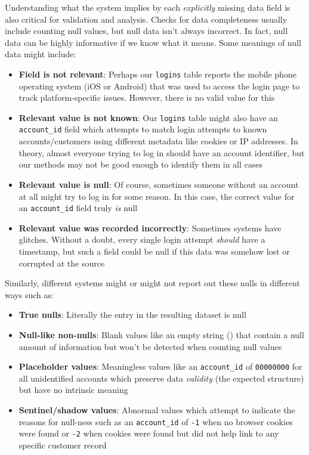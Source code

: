 \documentclass[
]{krantz}
\providecommand{\tightlist}{%
  \setlength{\itemsep}{0pt}\setlength{\parskip}{0pt}}
\begin{document}
Understanding what the system implies by each \emph{explicitly} missing data field is also critical for validation and analysis.
Checks for data completeness usually include counting null values, but null data isn't always incorrect.
In fact, null data can be highly informative if we know what it means. Some meanings of null data might include:

\begin{itemize}
\tightlist
\item
  \textbf{Field is not relevant}: Perhaps our \texttt{logins} table reports the mobile phone operating system (iOS or Android) that was used to access the login page to track platform-specific issues. However, there is no valid value for this
\item
  \textbf{Relevant value is not known}: Our \texttt{logins} table might also have an \texttt{account\_id} field which attempts to match login attempts to known accounts/customers using different metadata like cookies or IP addresses. In theory, almost everyone trying to log in should have an account identifier, but our methods may not be good enough to identify them in all cases
\item
  \textbf{Relevant value is null}: Of course, sometimes someone without an account at all might try to log in for some reason. In this case, the correct value for an \texttt{account\_id} field truly \emph{is} null
\item
  \textbf{Relevant value was recorded incorrectly}: Sometimes systems have glitches. Without a doubt, every single login attempt \emph{should} have a timestamp, but such a field could be null if this data was somehow lost or corrupted at the source
\end{itemize}

Similarly, different systems might or might not report out these nulls in different ways such as:

\begin{itemize}
\tightlist
\item
  \textbf{True nulls}: Literally the entry in the resulting dataset is null
\item
  \textbf{Null-like non-nulls}: Blank values like an empty string (\texttt{\textquotesingle{}\textquotesingle{}}) that contain a null amount of information but won't be detected when counting null values
\item
  \textbf{Placeholder values}: Meaningless values like an \texttt{account\_id} of \texttt{00000000} for all unidentified accounts which preserve data \emph{validity} (the expected structure) but have no intrinsic meaning
\item
  \textbf{Sentinel/shadow values}: Abnormal values which attempt to indicate the reasons for null-ness such as an \texttt{account\_id} of \texttt{-1} when no browser cookies were found or \texttt{-2} when cookies were found but did not help link to any specific customer record
\end{itemize}
\end{document}
